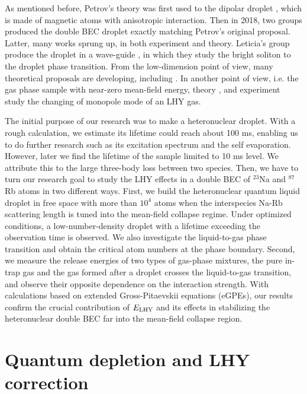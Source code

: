 As mentioned before, Petrov's theory was first used to the dipolar droplet \cite{ferrier2016Liquid,chomaz2016}, which is made of magnetic atoms with anisotropic interaction. Then in 2018, two groups \cite{cabrera2018quantum,semeghini2018self} produced the double BEC droplet exactly matching Petrov's original proposal. Latter, many works sprung up, in both experiment and theory. Leticia's group produce the droplet in a wave-guide \cite{cheiney2018bright}, in which they study the bright soliton to the droplet phase transition. From the low-dimension point of view, many theoretical proposals are developing, including \cite{petrov2016ultradilute,Ilg2018,Cui2021}. In another point of view, i.e. the gas phase sample with near-zero mean-field energy, theory \cite{Jorgensen2018}, and experiment \cite{skov2020} study the changing of monopole mode of an LHY gas. 

The initial purpose of our research was to make a heteronuclear droplet. With a rough calculation, we estimate its lifetime could reach about 100 ms, enabling us to do further research such as its excitation spectrum and the self evaporation. However, later we find the lifetime of the sample limited to 10 ms level. We attribute this to the large three-body loss between two species. Then, we have to turn our research goal to study the LHY effects in a double BEC of $^{23}$Na and $^{87}$Rb atoms in two different ways. First, we build the heteronuclear quantum liquid droplet in free space with more than $10^4$ atoms when the interspecies Na-Rb scattering length is tuned into the mean-field collapse regime. Under optimized conditions, a low-number-density droplet with a lifetime exceeding the observation time is observed. We also investigate the liquid-to-gas phase transition and obtain the critical atom numbers at the phase boundary. Second, we measure the release energies of two types of gas-phase mixtures, the pure in-trap gas and the gas formed after a droplet crosses the liquid-to-gas transition, and observe their opposite dependence on the interaction strength.  With calculations based on extended Gross-Pitaevskii equations (eGPEs), our results confirm the crucial contribution of $E_{\rm LHY}$ and its effects in stabilizing the heteronuclear double BEC far into the mean-field collapse region.

\section{Quantum depletion and LHY correction}
\label{sec:intro-LHY}

